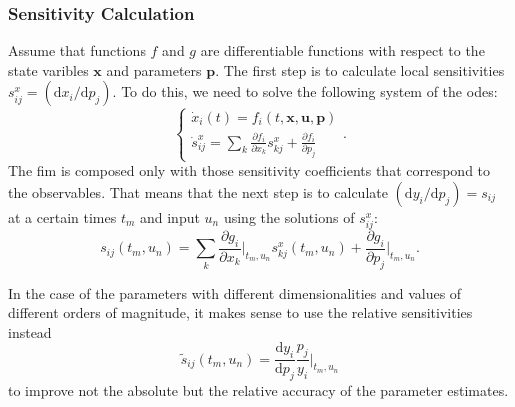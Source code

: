 \documentclass[10pt,A4paper]{article}
\newcommand{\mbx}{\mathbf{x}}
\newcommand{\mbu}{\mathbf{u}}
\newcommand{\mbp}{\mathbf{p}}
\begin{document}
\subsubsection*{Sensitivity Calculation}
Assume that functions $f$ and $g$ are differentiable functions with respect to the state varibles $\mbx$ and parameters $\mbp$.
The first step is to calculate local sensitivities $s^x_{ij} = (\mathrm{d} x_i / \mathrm{d} p_j )$.
To do this, we need to solve the following system of the \acp{ode}:
\begin{equation}
    \begin{cases}
    \dot x_i (t) = f_i(t, \mbx, \mbu, \mbp)\\
    \dot s^x_{ij} = \sum_k \frac{\partial f_i}{\partial x_k} s^x_{kj} + \frac{\partial f_i}{\partial p_j}
    \end{cases}.
\label{eq:ode_and_sensitiv}
\end{equation} 
The \ac{fim} is composed only with those sensitivity coefficients that correspond to the observables.
That means that the next step is to calculate $(\mathrm{d} y_i / \mathrm{d} p_j) = s_{ij}$ at a certain times $t_m$ and input $u_n$ using the solutions of $s^x_{ij}$:
\begin{equation}
    s_{ij} (t_m, u_n) = \sum_k \frac{\partial g_i}{\partial x_k}\bigg|_{t_m, u_n} s_{kj}^x (t_m, u_n) + \frac{\partial g_i}{\partial p_j}\bigg|_{t_m, u_n}.
\label{eq:observ_sensitivities}
\end{equation}

In the case of the parameters with different dimensionalities and values of different orders of magnitude, it makes sense to use the relative sensitivities instead
\begin{equation}
    \tilde{s}_{ij} (t_m, u_n) = \frac{\mathrm{d} y_i}{\mathrm{d} p_j} \frac{p_j}{y_i}\bigg|_{t_m, u_n}
\label{eq:relat_sensitivities}
\end{equation}
to improve not the absolute but the relative accuracy of the parameter estimates.
\end{document}
